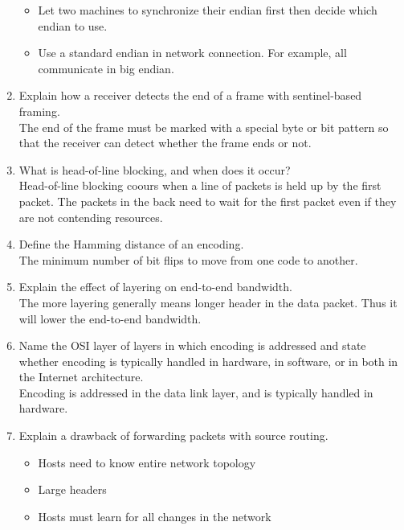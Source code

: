 \documentclass[10pt, a4paper]{article}
\begin{document}
\begin{enumerate}
    \begin{itemize}
    \item Let two machines to synchronize their endian first then decide which endian to use.
    \item Use a standard endian in network connection. For example, all communicate in big endian.
    \end{itemize}
    \color{black}
\item\mbox{} Explain how a receiver detects the end of a frame with sentinel-based framing.\\
    \color{blue}
    The end of the frame must be marked with a special byte or bit pattern so that the receiver can detect whether the frame ends or not.
    \color{black}
\item\mbox{}What is head-of-line blocking, and when does it occur?\\
    \color{blue}
    Head-of-line blocking coours when a line of packets is held up by the first packet. The packets in the back need to wait for the first packet even if they are not contending resources.
    \color{black}
\item\mbox{}Define the Hamming distance of an encoding.\\
    \color{blue}
    The minimum number of bit flips to move from one code to another.
    \color{black}
\item\mbox{}Explain the effect of layering on end-to-end bandwidth.\\
    \color{blue}
    The more layering generally means longer header in the data packet. Thus it will lower the end-to-end bandwidth.
    \color{black}
\item\mbox{}Name the OSI layer of layers in which encoding is addressed and state whether encoding is typically handled in hardware, in software, or in both in the Internet architecture.\\
    \color{blue}
    Encoding is addressed in the data link layer, and is typically handled in hardware.
    \color{black}
\item\mbox{}Explain a drawback of forwarding packets with source routing.
    \color{blue}
    \begin{itemize}
    \item Hosts need to know entire network topology
    \item Large headers
    \item Hosts must learn for all changes in the network
    \end{itemize}

\end{enumerate}
\end{document}
